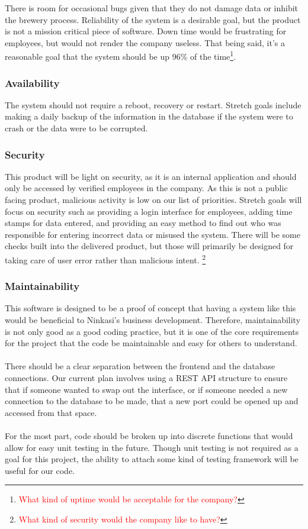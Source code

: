 \documentclass[draftclsnofoot,onecolumn,letterpaper,10pt,compsoc]{IEEEtran}
\newcommand\question[1]{\footnote{\textcolor{red}{#1}}}
\begin{document}
		There is room for occasional bugs given that they do not damage data or inhibit the brewery process.
		Reliability of the system is a desirable goal, but the product is not a mission critical piece of software.
		Down time would be frustrating for employees, but would not render the company useless.
		That being said, it’s a reasonable goal that the system should be up 96\% of the time\question{What kind of uptime would be acceptable for the company?}.

		\subsubsection{Availability}

		The system should not require a reboot, recovery or restart.
		Stretch goals include making a daily backup of the information in the database if the system were to crash or the data were to be corrupted.

		\subsubsection{Security}

		This product will be light on security, as it is an internal application and should only be accessed by verified employees in the company.
		As this is not a public facing product, malicious activity is low on our list of priorities.
		Stretch goals will focus on security such as providing a login interface for employees, adding time stamps for data entered, and providing an easy method to find out who was responsible for entering incorrect data or misused the system.
		There will be some checks built into the delivered product, but those will primarily be designed for taking care of user error rather than malicious intent.
		\question{What kind of security would the company like to have?}

		\subsubsection{Maintainability}

		This software is designed to be a proof of concept that having a system like this would be beneficial to Ninkasi's business development.
		Therefore, maintainability is not only good as a good coding practice, but it is one of the core requirements for the project that the code be maintainable and easy for others to understand.
		\\ \\
		There should be a clear separation between the frontend and the database connections.
		Our current plan involves using a REST API structure to ensure that if someone wanted to swap out the interface, or if someone needed a new connection to the database to be made, that a new port could be opened up and accessed from that space.
		\\ \\
		For the most part, code should be broken up into discrete functions that would allow for easy unit testing in the future.
		Though unit testing is not required as a goal for this project, the ability to attach some kind of testing framework will be useful for our code.
\end{document}
